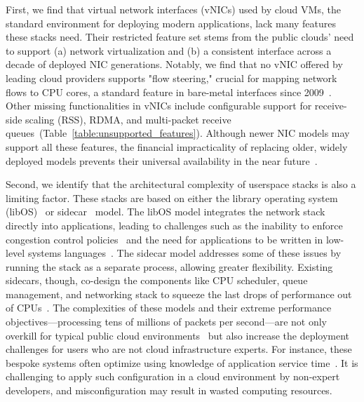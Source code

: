 First, we find that virtual network interfaces (vNICs) used by cloud VMs, the standard environment for deploying modern applications, lack many features these stacks need.
Their restricted feature set stems from the public clouds' need to support (a) network virtualization and (b) a consistent interface across a decade of deployed NIC generations.
Notably, we find that no vNIC offered by leading cloud providers supports "flow steering," crucial for mapping network flows to CPU cores, a standard feature in bare-metal interfaces since 2009~\cite{intel-82599}. 
Other missing functionalities in vNICs include configurable support for receive-side scaling (RSS), RDMA, and multi-packet receive queues~(Table~\ref{table:unsupported_features}).
Although newer NIC models may support all these features, the financial impracticality of replacing older, widely deployed models prevents their universal availability in the near future~\cite{nic-purchase}.

Second, we identify that the architectural complexity of userspace stacks is also a limiting factor.
These stacks are based on either the library operating system (libOS)~\cite{erpc, mtcp} or sidecar~\cite{tas, snap} model.
The libOS model integrates the network stack directly into applications, leading to challenges such as the inability to enforce congestion control policies~\cite{shinjuku} and the need for applications to be written in low-level systems languages~\cite{belay2014ix, demi-kernel}.
The sidecar model addresses some of these issues by running the stack as a separate process, allowing greater flexibility.
Existing sidecars, though, co-design the components like CPU scheduler, queue management, and networking stack to squeeze the last drops of performance out of CPUs~\cite{shenango, snap, caladan}.
The complexities of these models and their extreme performance objectives—processing tens of millions of packets per second—are not only overkill for typical public cloud environments~\cite{twitter-trace} but also increase the deployment challenges for users who are not cloud infrastructure experts.
For instance, these bespoke systems often optimize using knowledge of application service time~\cite{demi-kernel, shenango, kogias2019r2p2}.
It is challenging to apply such configuration in a cloud environment by non-expert developers, and misconfiguration may result in wasted computing resources.

